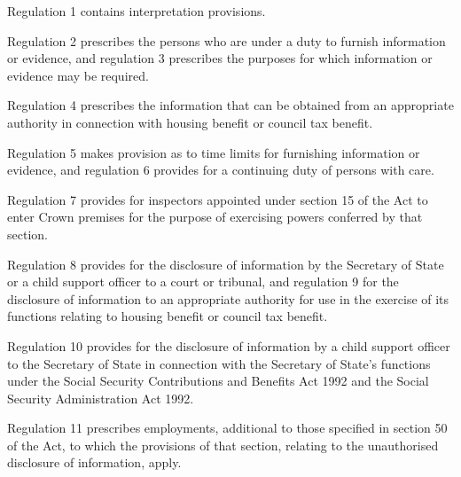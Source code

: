 \documentclass[a4paper]{article}
\begin{document}
  Regulation 1 contains interpretation provisions.

  Regulation 2 prescribes the persons who are under a duty to furnish information or evidence, and regulation 3 prescribes the purposes for which information or evidence may be required.

  Regulation 4 prescribes the information that can be obtained from an appropriate authority in connection with housing benefit or council tax benefit.

  Regulation 5 makes provision as to time limits for furnishing information or evidence, and regulation 6 provides for a continuing duty of persons with care.

  Regulation 7 provides for inspectors appointed under section 15 of the Act to enter Crown premises for the purpose of exercising powers conferred by that section.

  Regulation 8 provides for the disclosure of information by the Secretary of State or a child support officer to a court or tribunal, and regulation 9 for the disclosure of information to an appropriate authority for use in the exercise of its functions relating to housing benefit or council tax benefit.

  Regulation 10 provides for the disclosure of information by a child support officer to the Secretary of State in connection with the Secretary of State’s functions under the Social Security Contributions and Benefits Act 1992 and the Social Security Administration Act 1992.

  Regulation 11 prescribes employments, additional to those specified in section 50 of the Act, to which the provisions of that section, relating to the unauthorised disclosure of information, apply.
\end{document}
